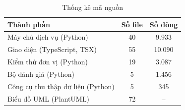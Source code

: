 \begin{table}[H]
\centering
\small
\caption{Thống kê mã nguồn}
\label{tab:thongke}
\begin{tabular}{|L{6.4cm}|c|c|}
\hline
\textbf{Thành phần} & \textbf{Số file} & \textbf{Số dòng} \\ \hline
Máy chủ dịch vụ (Python) & 40 & 9.933 \\ \hline
Giao diện (TypeScript, TSX) & 55 & 10.090 \\ \hline
Kiểm thử đơn vị (Python) & 19 & 3.087 \\ \hline
Bộ đánh giá (Python) & 5 & 1.456 \\ \hline
Công cụ thu thập dữ liệu (Python) & 5 & 345 \\ \hline
Biểu đồ UML (PlantUML) & 72 & -- \\ \hline
\end{tabular}
\end{table}
